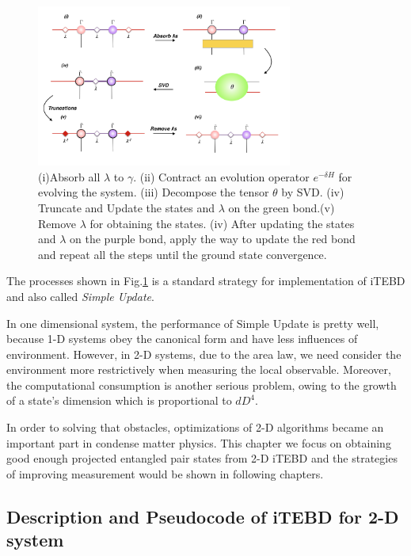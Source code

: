 \label{1ditebd}
\begin{figure}[ht]
	\centering
	\includegraphics[width=0.75\textwidth]{figures/fig313.png}
	\caption[The tensor network diagrams for the 1-D iTEBD]{ (i)Absorb all $\lambda$ to $\gamma$. (ii) Contract an evolution operator $e^{-\delta H}$ for evolving the system. (iii) Decompose the tensor $\theta$ by SVD. (iv) Truncate and Update the states and $\lambda$ on the green bond.(v) Remove $
		\lambda$ for obtaining the states. (iv) After updating the states and $\lambda$ on the purple bond, apply the way to update the red bond and repeat all the steps until the ground state convergence.}
	\label{fig313}
\end{figure}

The processes shown in Fig.\ref{fig313} is a standard strategy for implementation of iTEBD and also called \textit{Simple Update}. 

In one dimensional system, the performance of Simple Update is pretty well, because 1-D systems obey the canonical form and have less influences of environment. However, in 2-D systems, due to the area law, we need consider the environment more restrictively when measuring the local observable. Moreover, the computational consumption is another serious problem, owing to the growth of a state's dimension which is proportional to $dD^4$.

In order to solving that obstacles, optimizations of 2-D algorithms  became an important part in condense matter physics. This chapter we focus on obtaining good enough projected entangled pair states from 2-D iTEBD and the strategies of improving measurement would be shown in following chapters.

\subsection{Description and Pseudocode of iTEBD for 2-D system}
\label{2ditebd}

